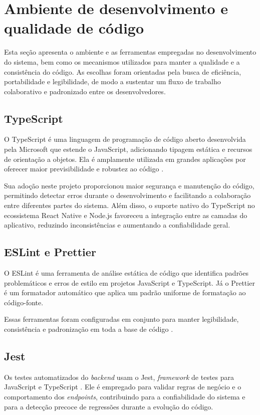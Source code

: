     \section{Ambiente de desenvolvimento e qualidade de código}
        \label{sec:tec-qualidade}

        Esta seção apresenta o ambiente e as ferramentas empregadas no desenvolvimento do sistema, bem como os mecanismos utilizados para manter a qualidade e a consistência do código. As escolhas foram orientadas pela busca de eficiência, portabilidade e legibilidade, de modo a sustentar um fluxo de trabalho colaborativo e padronizado entre os desenvolvedores.

        \subsection{TypeScript}
        O TypeScript é uma linguagem de programação de código aberto desenvolvida pela Microsoft que estende o JavaScript, adicionando tipagem estática e recursos de orientação a objetos. Ela é amplamente utilizada em grandes aplicações por oferecer maior previsibilidade e robustez ao código \cite{typescript_handbook}.

        Sua adoção neste projeto proporcionou maior segurança e manutenção do código, permitindo detectar erros durante o desenvolvimento e facilitando a colaboração entre diferentes partes do sistema. Além disso, o suporte nativo do TypeScript no ecossistema React Native e Node.js favoreceu a integração entre as camadas do aplicativo, reduzindo inconsistências e aumentando a confiabilidade geral.

        \subsection{ESLint e Prettier}
        O ESLint é uma ferramenta de análise estática de código que identifica padrões problemáticos e erros de estilo em projetos JavaScript e TypeScript. Já o Prettier é um formatador automático que aplica um padrão uniforme de formatação ao código-fonte.

        Essas ferramentas foram configuradas em conjunto para manter legibilidade, consistência e padronização em toda a base de código \cite{eslint_docs,prettier_docs}.

        \subsection{Jest}
        Os testes automatizados do \textit{backend} usam o Jest, \textit{framework} de testes para JavaScript e TypeScript \cite{jest_docs}. Ele é empregado para validar regras de negócio e o comportamento dos \textit{endpoints}, contribuindo para a confiabilidade do sistema e para a detecção precoce de regressões durante a evolução do código.

